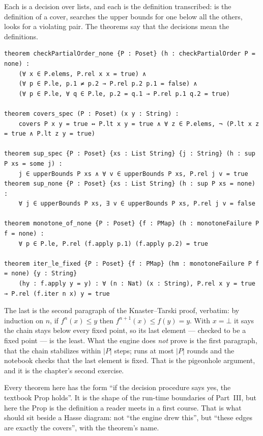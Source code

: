 Each is a decision over lists, and each is the definition transcribed:  is the
definition of a cover,  searches the upper bounds for one below all the others,
 looks for a violating pair. The theorems say that the decisions mean the
definitions.

\begin{verbatim}
theorem checkPartialOrder_none {P : Poset} (h : checkPartialOrder P = none) :
    (∀ x ∈ P.elems, P.rel x x = true) ∧
    (∀ p ∈ P.le, p.1 ≠ p.2 → P.rel p.2 p.1 = false) ∧
    (∀ p ∈ P.le, ∀ q ∈ P.le, p.2 = q.1 → P.rel p.1 q.2 = true)

theorem covers_spec (P : Poset) (x y : String) :
    covers P x y = true ↔ P.lt x y = true ∧ ∀ z ∈ P.elems, ¬ (P.lt x z = true ∧ P.lt z y = true)

theorem sup_spec {P : Poset} {xs : List String} {j : String} (h : sup P xs = some j) :
    j ∈ upperBounds P xs ∧ ∀ v ∈ upperBounds P xs, P.rel j v = true
theorem sup_none {P : Poset} {xs : List String} (h : sup P xs = none) :
    ∀ j ∈ upperBounds P xs, ∃ v ∈ upperBounds P xs, P.rel j v = false

theorem monotone_of_none {P : Poset} {f : PMap} (h : monotoneFailure P f = none) :
    ∀ p ∈ P.le, P.rel (f.apply p.1) (f.apply p.2) = true

theorem iter_le_fixed {P : Poset} {f : PMap} (hm : monotoneFailure P f = none) {y : String}
    (hy : f.apply y = y) : ∀ (n : Nat) (x : String), P.rel x y = true → P.rel (f.iter n x) y = true
\end{verbatim}

The last is the second paragraph of the Knaster--Tarski proof, verbatim: by induction on $n$,
if $f^n(x) \le y$ then $f^{n+1}(x) \le f(y) = y$. With $x = \bot$ it says the chain stays below
every fixed point, so its last element --- checked to be a fixed point --- is the least. What the
engine does \emph{not} prove is the first paragraph, that the chain stabilizes within $|P|$
steps;  runs at most $|P|$ rounds and the notebook checks that the last element is
fixed. That is the pigeonhole argument, and it is the chapter's second exercise.

\begin{logbox}
  Every theorem here has the form ``if the decision procedure says yes, the textbook Prop
  holds''. It is the shape of the run-time boundaries of Part~III, but here the Prop is the
  definition a reader meets in a first course. That is what should sit beside a Hasse diagram:
  not ``the engine drew this'', but ``these edges are exactly the covers'', with the theorem's
  name.
\end{logbox}


